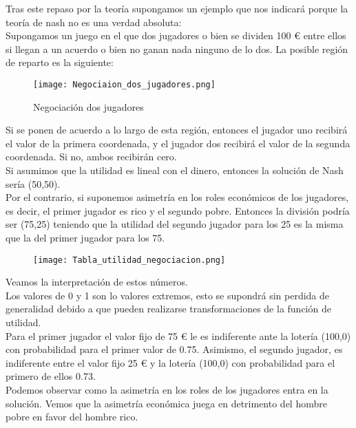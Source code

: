 \documentclass[10pt,a4paper]{book}
\begin{document}
 
Tras este repaso por la teoría supongamos un ejemplo que nos indicará porque la teoría de nash no es una verdad absoluta:\\

Supongamos un juego en el que dos jugadores o bien se dividen 100 € entre ellos si llegan a un acuerdo o bien no ganan nada ninguno de lo dos. La posible región de reparto es la siguiente:\\

\begin{figure}[htb]
\centering
\texttt{[image: Negociaion\_dos\_jugadores.png]}
\caption{Negociación dos jugadores}
\end{figure} 

Si se ponen de acuerdo a lo largo de esta región, entonces el jugador uno recibirá el valor de la primera coordenada, y el jugador dos recibirá el valor de la segunda coordenada. Si no, ambos recibirán cero.\\

Si asumimos que la utilidad es lineal con el dinero, entonces la solución de Nash sería (50,50).\\
	
Por el contrario, si suponemos asimetría en los roles económicos de los jugadores, es decir, el primer jugador es rico y el segundo pobre. Entonces la división podría ser (75,25) teniendo que la utilidad del segundo jugador para los 25 es la misma que la del primer jugador para los 75.\\

\begin{figure}[htb]
\centering
\texttt{[image: Tabla\_utilidad\_negociacion.png]}

\end{figure} 

Veamos la interpretación de estos números.\\

Los valores de 0 y 1 son lo valores extremos, esto se supondrá sin perdida de generalidad debido a que pueden realizarse transformaciones de la función de utilidad.\\

Para el primer jugador el valor fijo de 75 € le es indiferente ante la lotería (100,0) con probabilidad para el primer valor de 0.75. Asimismo, el segundo jugador, es indiferente entre el valor fijo 25 € y la lotería (100,0) con probabilidad para el primero de ellos 0.73.\\

Podemos observar como la asimetría en los roles de los jugadores entra en la solución. Vemos que la asimetría económica juega en detrimento del hombre pobre en favor del hombre rico. \\
\end{document}
